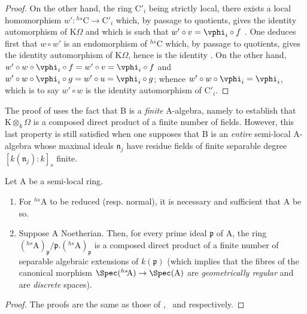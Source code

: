\begin{proof}
On the other hand, the ring $\mathrm{C}'_i$ being strictly local, there exists a local homomorphism $w':{}^{hs}\!\mathrm{C}\to\mathrm{C}'_i$ which, by passage to quotients, gives the identity automorphism of $\mathrm{K}\Omega$ and which is such that $w'\circ v=\vphi_i\circ f$ .
One deduces first that $w\circ w'$ is an endomorphism of ${}^{hs}\!\mathrm{C}$ which, by passage to quotients, gives the identity automorphism of $\mathrm{K}\Omega$, hence
is the identity .
On the other hand, $w'\circ w\circ\vphi_i\circ f=w'\circ v=\vphi_i\circ f$ and $w'\circ w\circ\vphi_i\circ g=w'\circ u=\vphi_i\circ g$;
whence $w'\circ w\circ\vphi_i=\vphi_i$, which is to say $w'\circ w$ is the identity automorphism of $\mathrm{C}'_i$.
\end{proof}

\begin{remark}[18.8.11]
\label{IV.18.8.11}
The proof of  uses the fact that B is a \emph{finite} A-algebra, namely to establish that $\mathrm{K}\otimes_k\Omega$ is a composed direct product of a finite number of fields.
However, this last property is still satisfied when one supposes that B is an \emph{entire} semi-local A-algebra whose maximal ideals $\mathfrak{n}_j$ have residue fields of finite separable degree $[k(\mathfrak{n}_j):k]_s$ finite.
\end{remark}

\begin{proposition}[18.8.12]
\label{IV.18.8.12}
Let $\mathrm{A}$ be a semi-local ring.
\begin{enumerate}[label=\emph{\roman*)}]
  \item For ${}^{hs}\!\mathrm{A}$ to be reduced (resp. normal), it is necessary and sufficient that A be so.
  \item Suppose A Noetherian.
  Then, for every prime ideal $\mathfrak{p}$ of A, the ring $({}^{hs}\!\mathrm{A})_{\mathfrak{p}}/\mathfrak{p}.({}^{hs}\!\mathrm{A})_{\mathfrak{p}}$ is a composed direct product of a finite number of separable algebraic extensions of $k(\mathfrak{p})$ (which implies that the fibres of the canonical morphism $\Spec({}^{hs}\!\mathrm{A})\to\Spec(\mathrm{A})$ are \emph{geometrically regular} and are \emph{discrete} spaces).
\end{enumerate}
\end{proposition}

\begin{proof}
The proofs are the same as those of ,~ and  respectively.
\end{proof}

